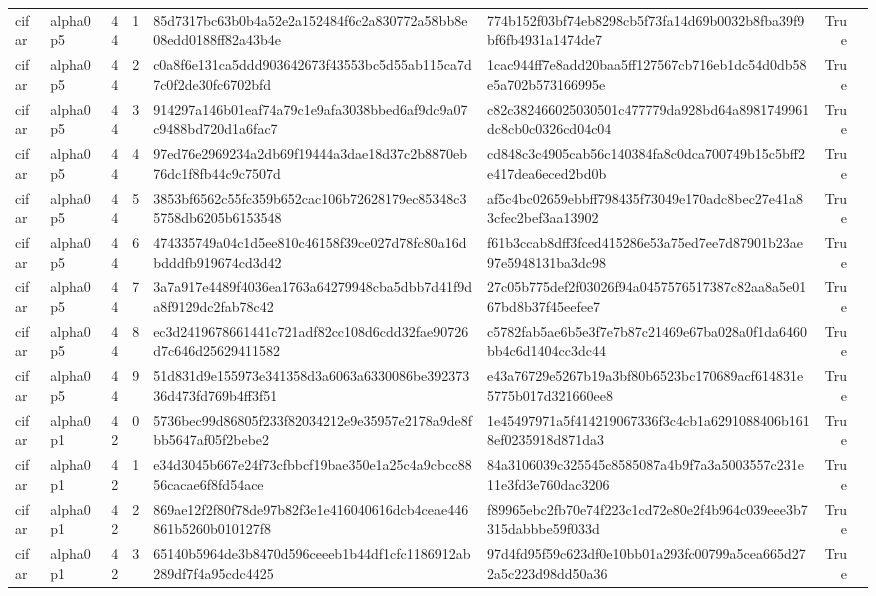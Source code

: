 \begin{tabular}{llrrllrl}
cifar & alpha0p5 & 44 & 1 & 85d7317bc63b0b4a52e2a152484f6c2a830772a58bb8e08edd0188ff82a43b4e & 774b152f03bf74eb8298cb5f73fa14d69b0032b8fba39f9bf6fb4931a1474de7 & True &  \\
cifar & alpha0p5 & 44 & 2 & c0a8f6e131ca5ddd903642673f43553bc5d55ab115ca7d7c0f2de30fc6702bfd & 1cac944ff7e8add20baa5ff127567cb716eb1dc54d0db58e5a702b573166995e & True &  \\
cifar & alpha0p5 & 44 & 3 & 914297a146b01eaf74a79c1e9afa3038bbed6af9dc9a07c9488bd720d1a6fac7 & c82c382466025030501c477779da928bd64a8981749961dc8cb0c0326cd04c04 & True &  \\
cifar & alpha0p5 & 44 & 4 & 97ed76e2969234a2db69f19444a3dae18d37c2b8870eb76dc1f8fb44c9c7507d & cd848c3c4905cab56c140384fa8c0dca700749b15c5bff2e417dea6eced2bd0b & True &  \\
cifar & alpha0p5 & 44 & 5 & 3853bf6562c55fc359b652cac106b72628179ec85348c35758db6205b6153548 & af5c4bc02659ebbff798435f73049e170adc8bec27e41a83cfec2bef3aa13902 & True &  \\
cifar & alpha0p5 & 44 & 6 & 474335749a04c1d5ee810c46158f39ce027d78fc80a16dbdddfb919674cd3d42 & f61b3ccab8dff3fced415286e53a75ed7ee7d87901b23ae97e5948131ba3dc98 & True &  \\
cifar & alpha0p5 & 44 & 7 & 3a7a917e4489f4036ea1763a64279948cba5dbb7d41f9da8f9129dc2fab78c42 & 27c05b775def2f03026f94a0457576517387c82aa8a5e0167bd8b37f45eefee7 & True &  \\
cifar & alpha0p5 & 44 & 8 & ec3d2419678661441c721adf82cc108d6cdd32fae90726d7c646d25629411582 & c5782fab5ae6b5e3f7e7b87c21469e67ba028a0f1da6460bb4c6d1404cc3dc44 & True &  \\
cifar & alpha0p5 & 44 & 9 & 51d831d9e155973e341358d3a6063a6330086be39237336d473fd769b4ff3f51 & e43a76729e5267b19a3bf80b6523bc170689acf614831e5775b017d321660ee8 & True &  \\
cifar & alpha0p1 & 42 & 0 & 5736bec99d86805f233f82034212e9e35957e2178a9de8fbb5647af05f2bebe2 & 1e45497971a5f414219067336f3c4cb1a6291088406b1618ef0235918d871da3 & True &  \\
cifar & alpha0p1 & 42 & 1 & e34d3045b667e24f73cfbbcf19bae350e1a25c4a9cbcc8856cacae6f8fd54ace & 84a3106039c325545c8585087a4b9f7a3a5003557c231e11e3fd3e760dac3206 & True &  \\
cifar & alpha0p1 & 42 & 2 & 869ae12f2f80f78de97b82f3e1e416040616dcb4ceae446861b5260b010127f8 & f89965ebc2fb70e74f223c1cd72e80e2f4b964c039eee3b7315dabbbe59f033d & True &  \\
cifar & alpha0p1 & 42 & 3 & 65140b5964de3b8470d596ceeeb1b44df1cfc1186912ab289df7f4a95cdc4425 & 97d4fd95f59c623df0e10bb01a293fc00799a5cea665d272a5c223d98dd50a36 & True &  \\

\end{tabular}
